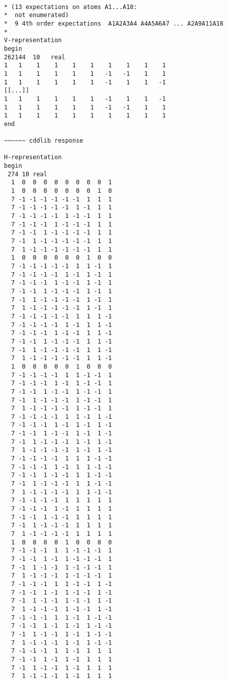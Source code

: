 \documentclass[%
 showpacs,
 showkeys,
 preprintnumbers,
 amsmath,amssymb,
 aps,
  pra,
  longbibliography,
 floatfix,
 ]{revtex4-1}
\begin{document}
{ \begin{lstlisting}[backgroundcolor=\color{yellow!10},framerule=0pt,breaklines=true, frame=tb]

* (13 expectations on atoms A1...A18:
*  not enumerated)
*  9 4th order expectations  A1A2A3A4 A4A5A6A7 ... A2A9A11A18
*
V-representation
begin
262144  10   real
1   1    1    1    1    1    1    1    1    1
1   1    1    1    1    1   -1   -1    1    1
1   1    1    1    1    1   -1    1    1   -1
[[...]]
1   1    1    1    1    1   -1    1    1   -1
1   1    1    1    1    1   -1   -1    1    1
1   1    1    1    1    1    1    1    1    1
end

~~~~~~ cddlib response

H-representation
begin
 274 10 real
  1  0  0  0  0  0  0  0  0  1
  1  0  0  0  0  0  0  0  1  0
  7 -1 -1 -1 -1 -1 -1  1  1  1
  7 -1 -1 -1 -1 -1  1 -1  1  1
  7 -1 -1 -1 -1  1 -1 -1  1  1
  7 -1 -1 -1  1 -1 -1 -1  1  1
  7 -1 -1  1 -1 -1 -1 -1  1  1
  7 -1  1 -1 -1 -1 -1 -1  1  1
  7  1 -1 -1 -1 -1 -1 -1  1  1
  1  0  0  0  0  0  0  1  0  0
  7 -1 -1 -1 -1 -1  1  1 -1  1
  7 -1 -1 -1 -1  1 -1  1 -1  1
  7 -1 -1 -1  1 -1 -1  1 -1  1
  7 -1 -1  1 -1 -1 -1  1 -1  1
  7 -1  1 -1 -1 -1 -1  1 -1  1
  7  1 -1 -1 -1 -1 -1  1 -1  1
  7 -1 -1 -1 -1 -1  1  1  1 -1
  7 -1 -1 -1 -1  1 -1  1  1 -1
  7 -1 -1 -1  1 -1 -1  1  1 -1
  7 -1 -1  1 -1 -1 -1  1  1 -1
  7 -1  1 -1 -1 -1 -1  1  1 -1
  7  1 -1 -1 -1 -1 -1  1  1 -1
  1  0  0  0  0  0  1  0  0  0
  7 -1 -1 -1 -1  1  1 -1 -1  1
  7 -1 -1 -1  1 -1  1 -1 -1  1
  7 -1 -1  1 -1 -1  1 -1 -1  1
  7 -1  1 -1 -1 -1  1 -1 -1  1
  7  1 -1 -1 -1 -1  1 -1 -1  1
  7 -1 -1 -1 -1  1  1 -1  1 -1
  7 -1 -1 -1  1 -1  1 -1  1 -1
  7 -1 -1  1 -1 -1  1 -1  1 -1
  7 -1  1 -1 -1 -1  1 -1  1 -1
  7  1 -1 -1 -1 -1  1 -1  1 -1
  7 -1 -1 -1 -1  1  1  1 -1 -1
  7 -1 -1 -1  1 -1  1  1 -1 -1
  7 -1 -1  1 -1 -1  1  1 -1 -1
  7 -1  1 -1 -1 -1  1  1 -1 -1
  7  1 -1 -1 -1 -1  1  1 -1 -1
  7 -1 -1 -1 -1  1  1  1  1  1
  7 -1 -1 -1  1 -1  1  1  1  1
  7 -1 -1  1 -1 -1  1  1  1  1
  7 -1  1 -1 -1 -1  1  1  1  1
  7  1 -1 -1 -1 -1  1  1  1  1
  1  0  0  0  0  1  0  0  0  0
  7 -1 -1 -1  1  1 -1 -1 -1  1
  7 -1 -1  1 -1  1 -1 -1 -1  1
  7 -1  1 -1 -1  1 -1 -1 -1  1
  7  1 -1 -1 -1  1 -1 -1 -1  1
  7 -1 -1 -1  1  1 -1 -1  1 -1
  7 -1 -1  1 -1  1 -1 -1  1 -1
  7 -1  1 -1 -1  1 -1 -1  1 -1
  7  1 -1 -1 -1  1 -1 -1  1 -1
  7 -1 -1 -1  1  1 -1  1 -1 -1
  7 -1 -1  1 -1  1 -1  1 -1 -1
  7 -1  1 -1 -1  1 -1  1 -1 -1
  7  1 -1 -1 -1  1 -1  1 -1 -1
  7 -1 -1 -1  1  1 -1  1  1  1
  7 -1 -1  1 -1  1 -1  1  1  1
  7 -1  1 -1 -1  1 -1  1  1  1
  7  1 -1 -1 -1  1 -1  1  1  1

\end{lstlisting}}
\end{document}

